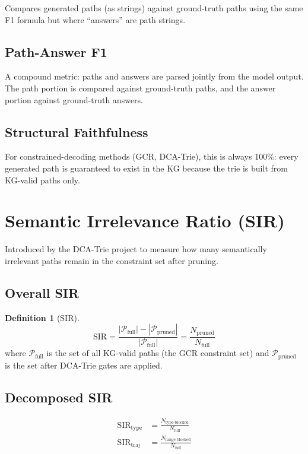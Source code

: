 \documentclass[11pt,a4paper,oneside,openany]{book}
\theoremstyle{definition}
\newtheorem{definition}{Definition}[chapter]
\begin{document}
Compares generated paths (as strings) against ground-truth paths using the same F1 formula but where ``answers'' are path strings.

\subsection{Path-Answer F1}

A compound metric: paths and answers are parsed jointly from the model output. The path portion is compared against ground-truth paths, and the answer portion against ground-truth answers.

\subsection{Structural Faithfulness}

For constrained-decoding methods (GCR, DCA-Trie), this is always 100\%: every generated path is guaranteed to exist in the KG because the trie is built from KG-valid paths only.

\section{Semantic Irrelevance Ratio (SIR)}

Introduced by the DCA-Trie project to measure how many semantically irrelevant paths remain in the constraint set after pruning.

\subsection{Overall SIR}

\begin{definition}[SIR]
	$$\text{SIR} = \frac{|\mathcal{P}_{\text{full}}| - |\mathcal{P}_{\text{pruned}}|}{|\mathcal{P}_{\text{full}}|} = \frac{N_{\text{pruned}}}{N_{\text{full}}}$$
	where $\mathcal{P}_{\text{full}}$ is the set of all KG-valid paths (the GCR constraint set) and $\mathcal{P}_{\text{pruned}}$ is the set after DCA-Trie gates are applied.
\end{definition}

\subsection{Decomposed SIR}

\begin{align*}
	\text{SIR}_{\text{type}} & = \frac{N_{\text{type-blocked}}}{N_{\text{full}}}  \\
	\text{SIR}_{\text{traj}} & = \frac{N_{\text{range-blocked}}}{N_{\text{full}}}
\end{align*}
\end{document}
